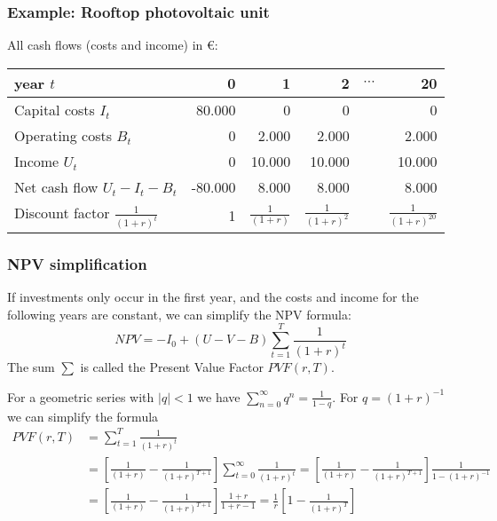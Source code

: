 \documentclass[10pt,aspectratio=169,dvipsnames]{beamer}
\begin{document}
\begin{frame}
  \frametitle{Example: Rooftop photovoltaic unit}

    All cash flows (costs and income) in \euro:
    \begin{table}[!t]
    \begin{tabular}{lrrrrr}
      \toprule
      year $t$ &  0 & 1 & 2 & $\cdots$ & 20 \\
      \midrule
      Capital costs $I_t$ & 80.000  & 0 & 0  & & 0\\
      Operating costs $B_t$ & 0 & 2.000 & 2.000 & & 2.000  \\
      Income $U_t$ & 0 & 10.000  & 10.000 & & 10.000 \\
      \midrule
      Net cash flow $U_t - I_t - B_t$ & -80.000 & 8.000 & 8.000 & & 8.000 \\
      \midrule
      Discount factor $\frac{1}{(1+r)^t}$ & 1 & $\frac{1}{(1+r)}$ & $\frac{1}{(1+r)^2}$ & &  $\frac{1}{(1+r)^{20}}$ \\
      \bottomrule
    \end{tabular}
    \end{table}


\end{frame}



\begin{frame}
  \frametitle{NPV simplification}

  If investments only occur in the first year, and the costs and income for the following years are constant, we can simplify the NPV formula:
  \begin{equation*}
    NPV = -I_0 + (U - V - B) \sum_{t=1}^T \frac{1}{(1+r)^t}
  \end{equation*}
  The sum $\sum$ is called the \alert{Present Value Factor} $PVF(r,T)$.

  For a geometric series with $|q| < 1$ we have $\sum_{n=0}^\infty q^n = \frac{1}{1-q}$.
  For $q= (1+r)^{-1}$ we can simplify the formula
  \begin{align*}
    PVF(r,T) & =  \sum_{t=1}^T \frac{1}{(1+r)^t} \\
             & = \left[\frac{1}{(1+r)} - \frac{1}{(1+r)^{T+1}}  \right] \sum_{t=0}^\infty \frac{1}{(1+r)^t}
              = \left[\frac{1}{(1+r)} - \frac{1}{(1+r)^{T+1}}  \right] \frac{1}{1 - (1+r)^{-1}} \\
             & = \left[\frac{1}{(1+r)} - \frac{1}{(1+r)^{T+1}}  \right] \frac{1+r}{1 + r  - 1}  = \frac{1}{r} \left[1  - \frac{1}{(1+r)^{T}}  \right]
  \end{align*}

\end{frame}
\end{document}
